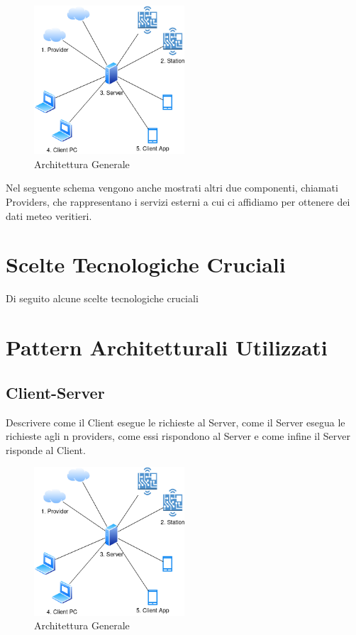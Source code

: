     \begin{figure}[H]
        \caption{Architettura Generale}
        \label{fig:General}
        \centering
        \includegraphics[width=0.5\textwidth]{DrawIo/General.png}
    \end{figure}
    
    \par Nel seguente schema vengono anche mostrati altri due componenti, chiamati Providers, che rappresentano i servizi esterni a cui ci affidiamo per ottenere dei dati meteo veritieri.
    
    \section{Scelte Tecnologiche Cruciali}
    Di seguito alcune scelte tecnologiche cruciali

    \section{Pattern Architetturali Utilizzati}
        \subsection{Client-Server}
        Descrivere come il Client esegue le richieste al Server, come il Server esegua le richieste agli n providers, come essi rispondono al Server e come infine il Server risponde al Client.
    
    \begin{figure}[H]
        \caption{Architettura Generale}
        \label{fig:General}
        \centering
        \includegraphics[width=0.5\textwidth]{DrawIo/General.png}
    \end{figure}